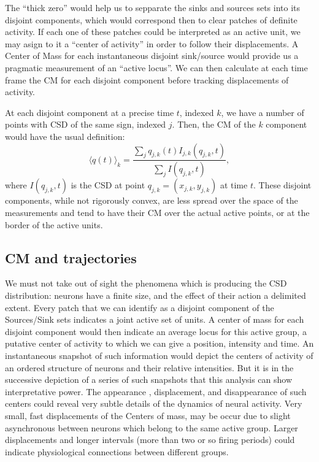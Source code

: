 \documentclass{article}
\begin{document}
The ``thick zero'' would help us to sepparate the sinks and sources sets into its disjoint components, which would correspond then to clear patches of definite activity. If each one of these patches could be interpreted as an active unit, we may asign to it a ``center of activity'' in order to follow their displacements. A Center of Mass for each instantaneous disjoint sink/source would provide us a pragmatic measurement of an ``active locus''. We can then calculate at each time frame the CM for each disjoint component before tracking displacements of activity.

At each disjoint component at a precise time $t$, indexed $k$, we have a number of points with CSD of the same sign, indexed $j$. Then, the CM of the $k$ component would have the usual definition:
\begin{equation}\label{cmparadisj}
   \langle q(t) \rangle_k =\frac{\sum_j q_{j,k} (t) I_{j,k} (q_{j,k},t)}
           {\sum_j I(q_{j,k},t)},
\end{equation}
where $I(q_{j,k},t)$ is the CSD at point $q_{j,k}=(x_{j,k}, y_{j,k})$ at time $t$. These disjoint components, while not rigorously convex, are less spread over the space of the measurements and tend to have their CM over the actual active points, or at the border of the active units. 

\subsection{CM and trajectories}

We must not take out of sight the phenomena which is producing the CSD distribution: neurons have a finite size, and the effect of their action a delimited extent. Every patch that we can identify as a disjoint component of the Sources/Sink sets indicates a  joint active set of units. A center of mass for each disjoint component would then indicate an average locus for this active group, a putative center of activity to which we can give a position, intensity and time. An instantaneous snapshot of such information would depict the centers of activity of an ordered structure of neurons and their relative intensities. But it is in the successive depiction of a series of such snapshots that this analysis can show interpretative power. The appearance , displacement, and disappearance of such centers could reveal very subtle details of the dynamics of neural activity. Very small, fast displacements of the Centers of mass, may be occur due to slight asynchronous between neurons which belong to the same active group. Larger displacements and  longer intervals (more than two or so firing periods) could indicate physiological connections between different groups.
\end{document}
